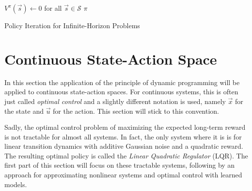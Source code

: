 				\begin{algorithm}  \DontPrintSemicolon
					\( V^\pi(\vec{s}) \gets 0 \) for all \( \vec{s} \in \mathcal{S} \) \;
					\Return \( \pi \) \;

					\caption{Policy Iteration for Infinite-Horizon Problems}
					\label{alg:policyIteration}
				\end{algorithm}

	\section{Continuous State-Action Space}
		In this section the application of the principle of dynamic programming will be applied to continuous state-action spaces. For continuous systems, this is often just called \emph{optimal control} and a slightly different notation is used, namely \(\vec{x}\) for the state and \(\vec{u}\) for the action. This section will stick to this convention.

		Sadly, the optimal control problem of maximizing the expected long-term reward is not tractable for almost all systems. In fact, the only system where it is is for linear transition dynamics with additive Gaussian noise and a quadratic reward. The resulting optimal policy is called the \emph{Linear Quadratic Regulator} (LQR). The first part of this section will focus on these tractable systems, following by an approach for approximating nonlinear systems and optimal control with learned models.

